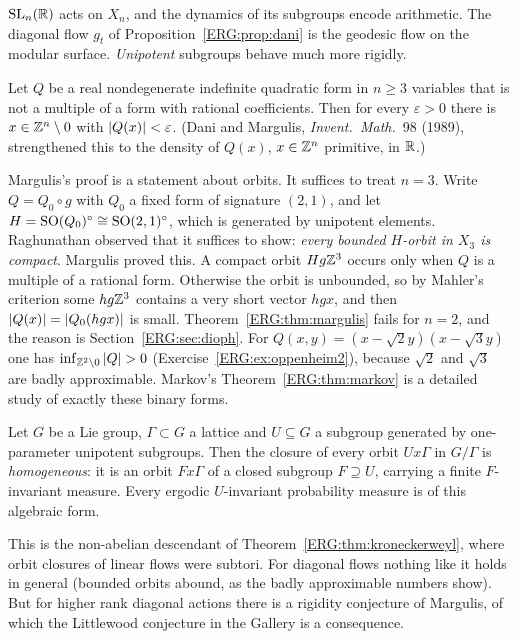 $\mathrm{SL}_n(\mathbb{R})$ acts on $X_n$, and the dynamics of its subgroups encode arithmetic. The diagonal flow
$g_t$ of Proposition~\ref{ERG:prop:dani} is the geodesic flow on the modular surface. \emph{Unipotent}
subgroups behave much more rigidly.

\begin{theorem}\label{ERG:thm:margulis}
Let $Q$ be a real nondegenerate indefinite quadratic form in $n\ge3$ variables that is not a multiple of a
form with rational coefficients. Then for every $\varepsilon>0$ there is $x\in\mathbb{Z}^n\setminus0$ with
$\left\lvert Q(x) \right\rvert<\varepsilon$. (Dani and Margulis, \emph{Invent.\ Math.}~98 (1989), strengthened this to the
density of $Q(x)$, $x\in\mathbb{Z}^n$ primitive, in $\mathbb{R}$.)
\end{theorem}

Margulis's proof is a statement about orbits. It suffices to treat $n=3$. Write $Q=Q_0\circ g$ with
$Q_0$ a fixed form of signature $(2,1)$, and let $H=\mathrm{SO}(Q_0)^\circ\cong\mathrm{SO}(2,1)^\circ$, which is generated by
unipotent elements. Raghunathan observed that it suffices to show: \emph{every bounded $H$-orbit in $X_3$ is
compact}. Margulis proved this. A compact orbit $Hg\mathbb{Z}^3$ occurs only when $Q$ is a multiple of a rational
form. Otherwise the orbit is unbounded, so by Mahler's criterion some $hg\mathbb{Z}^3$ contains a very short vector
$hgx$, and then $\left\lvert Q(x) \right\rvert=\left\lvert Q_0(hgx) \right\rvert$ is small. Theorem~\ref{ERG:thm:margulis} fails for $n=2$, and the
reason is Section~\ref{ERG:sec:dioph}. For $Q(x,y)=(x-\sqrt2y)(x-\sqrt3y)$ one has
$\inf_{\mathbb{Z}^2\setminus0}\left\lvert Q \right\rvert>0$ (Exercise~\ref{ERG:ex:oppenheim2}), because $\sqrt2$ and $\sqrt3$ are badly
approximable. Markov's Theorem~\ref{ERG:thm:markov} is a detailed study of exactly these binary forms.

\begin{theorem}[Ratner 1991]\label{ERG:thm:ratner}
Let $G$ be a Lie group, $\Gamma\subset G$ a lattice and $U\subseteq G$ a subgroup generated by
one-parameter unipotent subgroups. Then the closure of every orbit $Ux\Gamma$ in $G/\Gamma$ is
\emph{homogeneous}: it is an orbit $Fx\Gamma$ of a closed subgroup $F\supseteq U$, carrying a finite
$F$-invariant measure. Every ergodic $U$-invariant probability measure is of this algebraic form.
\end{theorem}

This is the non-abelian descendant of Theorem~\ref{ERG:thm:kroneckerweyl}, where orbit closures of linear
flows were subtori. For diagonal flows nothing like it holds in general (bounded orbits abound, as the
badly approximable numbers show). But for higher rank diagonal actions there is a rigidity conjecture of
Margulis, of which the Littlewood conjecture in the Gallery is a consequence.


